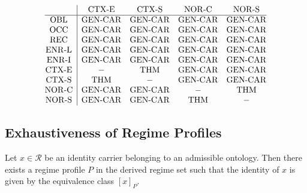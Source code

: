 \[
\begin{array}{@{}c|cccc@{}}
 & \mathrm{CTX\mbox{-}E} & \mathrm{CTX\mbox{-}S} & \mathrm{NOR\mbox{-}C} & \mathrm{NOR\mbox{-}S} \\
\hline
\mathrm{OBL} & \mathrm{GEN\mbox{-}CAR} & \mathrm{GEN\mbox{-}CAR} & \mathrm{GEN\mbox{-}CAR} & \mathrm{GEN\mbox{-}CAR} \\
\mathrm{OCC} & \mathrm{GEN\mbox{-}CAR} & \mathrm{GEN\mbox{-}CAR} & \mathrm{GEN\mbox{-}CAR} & \mathrm{GEN\mbox{-}CAR} \\
\mathrm{REC} & \mathrm{GEN\mbox{-}CAR} & \mathrm{GEN\mbox{-}CAR} & \mathrm{GEN\mbox{-}CAR} & \mathrm{GEN\mbox{-}CAR} \\
\mathrm{ENR\mbox{-}L} & \mathrm{GEN\mbox{-}CAR} & \mathrm{GEN\mbox{-}CAR} & \mathrm{GEN\mbox{-}CAR} & \mathrm{GEN\mbox{-}CAR} \\
\mathrm{ENR\mbox{-}I} & \mathrm{GEN\mbox{-}CAR} & \mathrm{GEN\mbox{-}CAR} & \mathrm{GEN\mbox{-}CAR} & \mathrm{GEN\mbox{-}CAR} \\
\mathrm{CTX\mbox{-}E} & - & \mathrm{THM} & \mathrm{GEN\mbox{-}CAR} & \mathrm{GEN\mbox{-}CAR} \\
\mathrm{CTX\mbox{-}S} & \mathrm{THM} & - & \mathrm{GEN\mbox{-}CAR} & \mathrm{GEN\mbox{-}CAR} \\
\mathrm{NOR\mbox{-}C} & \mathrm{GEN\mbox{-}CAR} & \mathrm{GEN\mbox{-}CAR} & - & \mathrm{THM} \\
\mathrm{NOR\mbox{-}S} & \mathrm{GEN\mbox{-}CAR} & \mathrm{GEN\mbox{-}CAR} & \mathrm{THM} & - \\
\end{array}
\]

\subsection{Exhaustiveness of Regime Profiles}
\label{subsec:exhaustiveness}

\begin{lemma}
\label{lem:profile_realizability}
Let $x \in \mathcal{R}$ be an identity carrier belonging to an admissible ontology.
Then there exists a regime profile $P$ in the derived regime set such that
the identity of $x$ is given by the equivalence class $[x]_P$.
\end{lemma}

